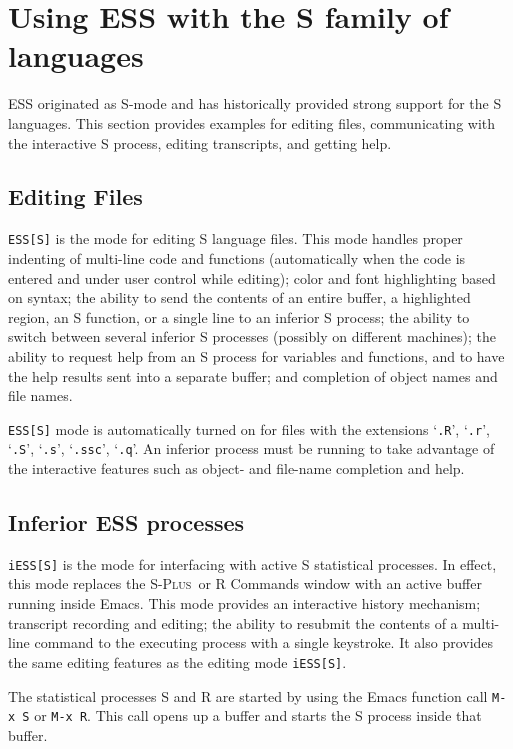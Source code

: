 \documentclass{article}
\newcommand*{\Splus}{\textsc{S-Plus}}
\newcommand{\stexttt}[1]{{\small\texttt{#1}}}
\newcommand{\file}[1]{`\stexttt{#1}'}
\begin{document}
\section{Using ESS with the S family of languages}
\label{sec:S}

ESS originated as S-mode and has historically provided strong support
for the S languages.  This section provides examples for editing
files, communicating with the interactive S process, editing
transcripts, and getting help.

\subsection{Editing Files}
\label{sec:S:edit}

\stexttt{ESS[S]} is the mode for editing S language files.  This mode
handles proper indenting of multi-line code and functions
(automatically when the code is entered and under user control while
editing); color and font highlighting based on syntax; the ability to
send the contents of an entire buffer, a highlighted region, an S
function, or a single line to an inferior S process; the ability to
switch between several inferior S processes (possibly on different
machines); the ability to request help from an S process for variables
and functions, and to have the help results sent into a separate
buffer; and completion of object names and file names.

\stexttt{ESS[S]} mode is automatically turned on for files with the
extensions \file{.R}, \file{.r}, \file{.S}, \file{.s}, \file{.ssc},
\file{.q}.  An inferior process must be running to take advantage of
the interactive features such as object- and file-name completion and
help.

\subsection{Inferior ESS processes}
\label{sec:S:inf}

\stexttt{iESS[S]} is the mode for interfacing with active S
statistical processes.  In effect, this mode replaces the \Splus\ or R
Commands window with an active buffer running inside Emacs.  This mode
provides an interactive history mechanism; transcript recording and
editing; the ability to resubmit the contents of a multi-line command
to the executing process with a single keystroke.  It also provides
the same editing features as the editing mode \stexttt{iESS[S]}.

The statistical processes S and R are started by using the Emacs
function call \stexttt{M-x~S} or \stexttt{M-x~R}.  This call opens up
a buffer and starts the S process inside that buffer.
\end{document}
